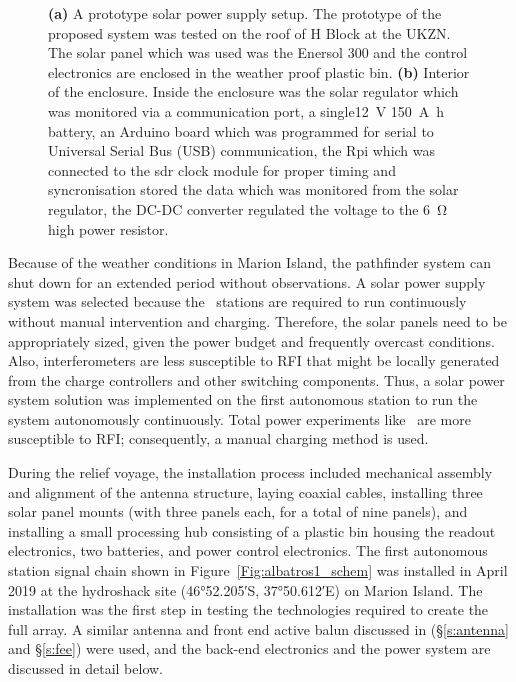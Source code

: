 \begin{figure}
\begin{subfigure}[t]{0.4\textwidth}
		\caption{} \label{Fig:rooftop2}
	\end{subfigure}
	\caption{{\bf (a)} A prototype solar power supply setup. The prototype of the proposed system was tested on the roof of H Block at the UKZN. The solar panel which was used was the Enersol 300 and the control electronics are enclosed in the weather proof plastic bin. {\bf (b)} Interior of the enclosure. Inside the enclosure was the solar regulator which was monitored via a communication port, a single\SI{12}{\volt} \SI{150}{\ampere \hour} battery, an Arduino board which was programmed for serial to Universal Serial Bus (USB) communication, the Rpi which was connected to the sdr clock module for proper timing and syncronisation stored the data which was monitored from the solar regulator, the DC-DC converter regulated the voltage to the \SI{6}{\ohm} high power resistor.} 
	\label{Fig:History}
\end{figure}

Because of the weather conditions in Marion Island, the pathfinder system can shut down for an extended period without observations. A solar power supply system was selected because the \albatros\ stations are required to run continuously without manual intervention and charging. Therefore, the solar panels need to be appropriately sized, given the power budget and frequently overcast conditions. Also, interferometers are less susceptible to RFI that might be locally generated from the charge controllers and other switching components. Thus, a solar power system solution was implemented on the first autonomous station to run the system autonomously continuously. Total power experiments like \prizm\ are more susceptible to RFI; consequently, a manual charging method is used.   

During the relief voyage, the installation process included mechanical assembly and alignment of the antenna structure, laying coaxial cables, installing three solar panel mounts (with three panels each, for a total of nine panels), and installing a small processing hub consisting of a plastic bin housing the readout electronics, two batteries, and power control electronics. The first autonomous station signal chain shown in Figure~\ref{Fig:albatros1_schem} was installed in April 2019 at the hydroshack site (\ang{46;52.205;}S, \ang{37;50.612;}E) on Marion Island. The installation was the first step in testing the technologies required to create the full array. A similar antenna and front end active balun discussed in (\S\ref{s:antenna} and \S\ref{s:fee}) were used, and the back-end electronics and the power system are discussed in detail below.

